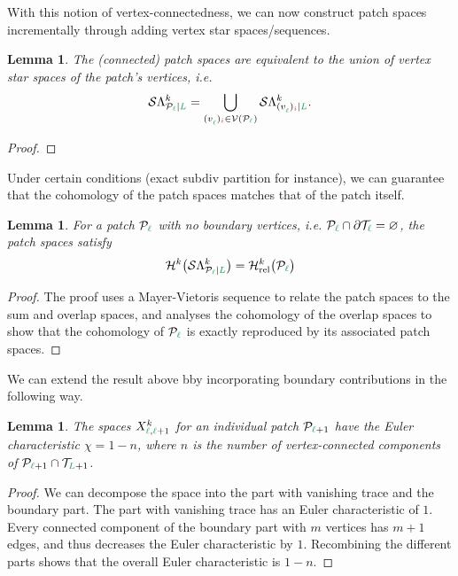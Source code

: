 \documentclass[12pt, a4paper]{article}
\newcommand{\green}{\color{ForestGreen}}
\newcommand{\brickred}{\color{BrickRed}}
\newcommand{\T}{\mathcal{T}}
\newcommand{\V}{\mathcal{V}}
\newcommand{\vertex}[2]{\freeQ{v}{}{#1}{#2}}
\newcommand{\coarseIdxone}{{\brickred i}}
\renewcommand{\l}{{\green\ell}}
\renewcommand{\L}{{\green L}}
\newcommand{\freeQ}[4]{({#1}^{#2}_{#3})_{#4}}
\newcommand{\SDFspace}[3]{\mathcal{S}\Lambda^{#1}_{#2 \vert #3}}
\newcommand{\calP}{\mathcal{P}}
\newtheorem{lemma}[theorem]{Lemma}
\numberwithin{equation}{section}
\begin{document}
With this notion of vertex-connectedness, we can now construct patch spaces incrementally through adding vertex star spaces/sequences.

\begin{lemma}
    The (connected) patch spaces are equivalent to the union of vertex star spaces of the patch's vertices, i.e.
    \begin{equation}
        \SDFspace{k}{\calP_\l}{\L} = \bigcup\limits_{\vertex{\l}{\coarseIdxone} \in \V(\calP_\l)} \SDFspace{k}{\vertex{\l}{\coarseIdxone}}{\L}.
    \end{equation}
\end{lemma}
\begin{proof}
    
\end{proof}

Under certain conditions (exact subdiv partition for instance), we can guarantee that the cohomology of the patch spaces matches that of the patch itself.

\begin{lemma}
    For a patch $\calP_\l$ with no boundary vertices, i.e. $\calP_\l \cap \partial \T_\l = \varnothing$, the patch spaces satisfy
    \begin{equation}
        \mathcal{H}^k \big( \SDFspace{k}{\calP_\l}{\L}\big) = \mathcal{H}^k_\mathrm{rel} \big( \calP_\l \big)
    \end{equation}
\end{lemma}
\begin{proof}
    The proof uses a Mayer-Vietoris sequence to relate the patch spaces to the sum and overlap spaces, and analyses the cohomology of the overlap spaces to show that the cohomology of $\calP_\l$ is exactly reproduced by its associated patch spaces.
\end{proof}

We can extend the result above bby incorporating boundary contributions in the following way.

\begin{lemma}
    The spaces $X^k_{\l, \l+1}$ for an individual patch $\calP_{\l+1}$ have the Euler characteristic $\chi = 1 - n$, where $n$ is the number of vertex-connected components of $\calP_{\l+1} \cap \T_{\L+1}$.
\end{lemma}
\begin{proof}
    We can decompose the space into the part with vanishing trace and the boundary part. The part with vanishing trace has an Euler characteristic of $1$. Every connected component of the boundary part with $m$ vertices has $m+1$ edges, and thus decreases the Euler characteristic by $1$. Recombining the different parts shows that the overall Euler characteristic is $1-n$.
\end{proof}
\end{document}
